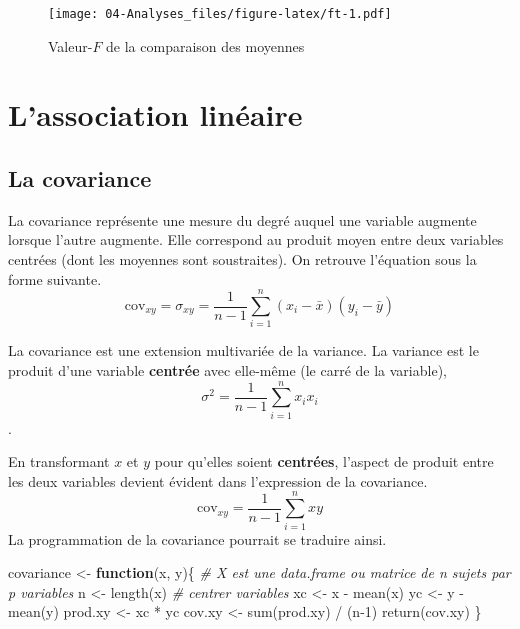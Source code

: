 \documentclass[
]{book}
\newenvironment{Shaded}{}{}
\newcommand{\CommentTok}[1]{\textit{#1}}
\newcommand{\ControlFlowTok}[1]{\textbf{#1}}
\newcommand{\DecValTok}[1]{#1}
\newcommand{\FunctionTok}[1]{#1}
\newcommand{\NormalTok}[1]{#1}
\newcommand{\OtherTok}[1]{#1}
\newcommand{\SpecialCharTok}[1]{#1}
\begin{document}
\begin{figure}
\centering
\texttt{[image: 04-Analyses\_files/figure-latex/ft-1.pdf]}
\caption{\label{fig:ft}Valeur-\(F\) de la comparaison des moyennes}
\end{figure}

\hypertarget{lassociation-linuxe9aire}{%
\section{L'association linéaire}\label{lassociation-linuxe9aire}}

\hypertarget{la-covariance}{%
\subsection{La covariance}\label{la-covariance}}

La covariance représente une mesure du degré auquel une variable augmente lorsque l'autre augmente. Elle correspond au produit moyen entre deux variables centrées (dont les moyennes sont soustraites). On retrouve l'équation sous la forme suivante.
\[\text{cov}_{xy} = \sigma_{xy}=\frac{1}{n-1}\sum_{i=1}^n(x_i-\bar{x})(y_i-\bar{y})\]

La covariance est une extension multivariée de la variance. La variance est le produit d'une variable \textbf{centrée} avec elle-même (le carré de la variable), \[\sigma^2=\frac{1}{n-1}\sum_{i=1}^nx_ix_i\].

En transformant \(x\) et \(y\) pour qu'elles soient \textbf{centrées}, l'aspect de produit entre les deux variables devient évident dans l'expression de la covariance.
\[\text{cov}_{xy} = \frac{1}{n-1}\sum_{i=1}^nxy\]
La programmation de la covariance pourrait se traduire ainsi.

\begin{Shaded}
\begin{Highlighting}[]
\NormalTok{covariance }\OtherTok{\textless{}{-}} \ControlFlowTok{function}\NormalTok{(x, y)\{}
  \CommentTok{\# X est une data.frame ou matrice de n sujets par p variables}
\NormalTok{  n }\OtherTok{\textless{}{-}} \FunctionTok{length}\NormalTok{(x)}
  \CommentTok{\# centrer variables}
\NormalTok{  xc }\OtherTok{\textless{}{-}}\NormalTok{ x }\SpecialCharTok{{-}} \FunctionTok{mean}\NormalTok{(x)}
\NormalTok{  yc }\OtherTok{\textless{}{-}}\NormalTok{ y }\SpecialCharTok{{-}} \FunctionTok{mean}\NormalTok{(y)}
\NormalTok{  prod.xy }\OtherTok{\textless{}{-}}\NormalTok{ xc }\SpecialCharTok{*}\NormalTok{ yc}
\NormalTok{  cov.xy }\OtherTok{\textless{}{-}} \FunctionTok{sum}\NormalTok{(prod.xy) }\SpecialCharTok{/}\NormalTok{ (n}\DecValTok{{-}1}\NormalTok{)}
  \FunctionTok{return}\NormalTok{(cov.xy)}
\NormalTok{\}}
\end{Highlighting}
\end{Shaded}
\end{document}
